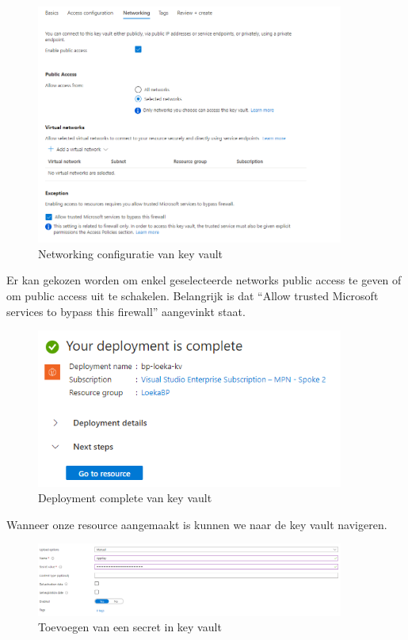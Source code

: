 \begin{figure}[H]
    \centering
    \includegraphics[width=0.9\textwidth]{./graphics/databricks/connection_10.png}
    \caption{Networking configuratie van key vault}
\end{figure}

Er kan gekozen worden om enkel geselecteerde networks public access te geven of om public access uit te schakelen. Belangrijk is dat ``Allow trusted Microsoft services to bypass this firewall'' aangevinkt staat.

\begin{figure}[H]
    \centering
    \includegraphics[width=0.9\textwidth]{./graphics/databricks/connection_11.png}
    \caption{Deployment complete van key vault}
\end{figure}

Wanneer onze resource aangemaakt is kunnen we naar de key vault navigeren.

\begin{figure}[H]
    \centering
    \includegraphics[width=0.9\textwidth]{./graphics/databricks/connection_12.png}
    \caption{Toevoegen van een secret in key vault}
\end{figure}

